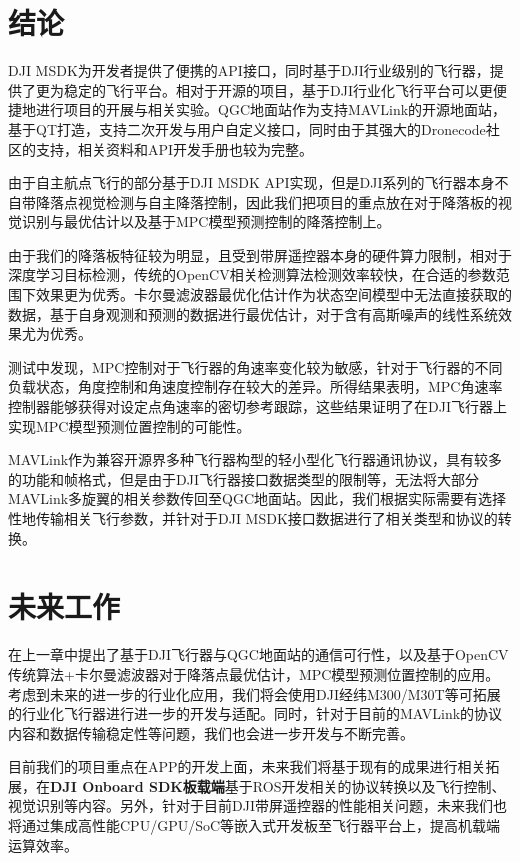 \section{结论}

DJI MSDK为开发者提供了便携的API接口，同时基于DJI行业级别的飞行器，提供了更为稳定的飞行平台。相对于开源的项目，基于DJI行业化飞行平台可以更便捷地进行项目的开展与相关实验。QGC地面站作为支持MAVLink的开源地面站，基于QT打造，支持二次开发与用户自定义接口，同时由于其强大的Dronecode社区的支持，相关资料和API开发手册也较为完整。

由于自主航点飞行的部分基于DJI MSDK API实现，但是DJI系列的飞行器本身不自带降落点视觉检测与自主降落控制，因此我们把项目的重点放在对于降落板的视觉识别与最优估计以及基于MPC模型预测控制的降落控制上。

由于我们的降落板特征较为明显，且受到带屏遥控器本身的硬件算力限制，相对于深度学习目标检测，传统的OpenCV相关检测算法检测效率较快，在合适的参数范围下效果更为优秀。卡尔曼滤波器最优化估计作为状态空间模型中无法直接获取的数据，基于自身观测和预测的数据进行最优估计，对于含有高斯噪声的线性系统效果尤为优秀。

测试中发现，MPC控制对于飞行器的角速率变化较为敏感，针对于飞行器的不同负载状态，角度控制和角速度控制存在较大的差异。所得结果表明，MPC角速率控制器能够获得对设定点角速率的密切参考跟踪，这些结果证明了在DJI飞行器上实现MPC模型预测位置控制的可能性。

MAVLink作为兼容开源界多种飞行器构型的轻小型化飞行器通讯协议，具有较多的功能和帧格式，但是由于DJI飞行器接口数据类型的限制等，无法将大部分MAVLink多旋翼的相关参数传回至QGC地面站。因此，我们根据实际需要有选择性地传输相关飞行参数，并针对于DJI MSDK接口数据进行了相关类型和协议的转换。

\section{未来工作}

在上一章中提出了基于DJI飞行器与QGC地面站的通信可行性，以及基于OpenCV传统算法+卡尔曼滤波器对于降落点最优估计，MPC模型预测位置控制的应用。考虑到未来的进一步的行业化应用，我们将会使用DJI经纬M300/M30T等可拓展的行业化飞行器进行进一步的开发与适配。同时，针对于目前的MAVLink的协议内容和数据传输稳定性等问题，我们也会进一步开发与不断完善。

目前我们的项目重点在APP的开发上面，未来我们将基于现有的成果进行相关拓展，在\textbf{DJI Onboard SDK板载端}基于ROS开发相关的协议转换以及飞行控制、视觉识别等内容。另外，针对于目前DJI带屏遥控器的性能相关问题，未来我们也将通过集成高性能CPU/GPU/SoC等嵌入式开发板至飞行器平台上，提高机载端运算效率。

